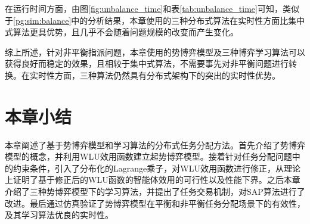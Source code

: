 在运行时间方面，由图\ref{fig:unbalance_time}和表\ref{tab:unbalance_time}可知，类似于\ref{pg:sim:balance}中的分析结果，本章使用的三种分布式算法在实时性方面比集中式算法更具优势，且几乎不会随着问题规模的改变而产生变化。

综上所述，针对非平衡指派问题，本章使用的势博弈模型及三种博弈学习算法可以获得良好而稳定的效果，且相较于集中式算法，不需要事先对非平衡问题进行转换。在实时性方面，三种算法仍然具有分布式架构下的突出的实时性优势。

\section{本章小结}
\label{pg:conclusion}

本章阐述了基于势博弈模型和学习算法的分布式任务分配方法。首先介绍了势博弈模型的概念，并利用WLU效用函数建立起势博弈模型。接着针对任务分配问题中的约束条件，引入了分布化的Lagrange乘子，对WLU效用函数进行修正，从理论上证明了基于修正后的WLU函数的智能体效用的可行性以及性能下界。之后本章介绍了三种势博弈模型下的学习算法，并提出了任务交易机制，对SAP算法进行了改进。最后通过仿真验证了势博弈模型在平衡和非平衡任务分配场景下的有效性，及其学习算法优良的实时性。





















